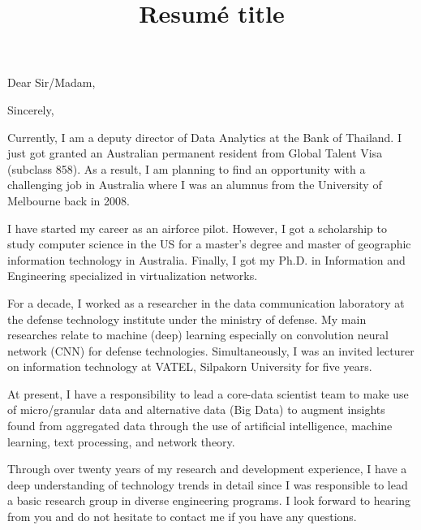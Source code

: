 \documentclass[11pt,a4paper,roman]{moderncv}        %
\title{Resumé title}                               %
\begin{document}
\recipient{}{}
\opening{Dear Sir/Madam,}
\closing{Sincerely,}
\makelettertitle
Currently, I am a deputy director of Data Analytics at the Bank of Thailand. I just got granted an Australian permanent resident from Global Talent Visa (subclass 858). As a result, I am planning to find an opportunity with a challenging job in Australia where I was an alumnus from the University of Melbourne back in 2008. 

I have started my career as an airforce pilot. However, I got a scholarship to study computer science in the US for a master's degree and master of geographic information technology in Australia. Finally, I got my Ph.D. in Information and Engineering specialized in virtualization networks.

For a decade, I worked as a researcher in the data communication laboratory at the defense technology institute under the ministry of defense. My main researches relate to machine (deep) learning especially on convolution neural network (CNN) for defense technologies. Simultaneously, I was an invited lecturer on information technology at VATEL, Silpakorn University for five years.

At present, I have a responsibility to lead a core-data scientist team to make use of micro/granular data and alternative data (Big Data) to augment insights found from aggregated data through the use of artificial intelligence, machine learning, text processing, and network theory.

Through over twenty years of my research and development experience, I have a deep understanding of technology trends in detail since I was responsible to lead a basic research group in diverse engineering programs.
I look forward to hearing from you and do not hesitate to contact me if you have any questions.



\vspace{0.5cm}


\makeletterclosing
\end{document}
